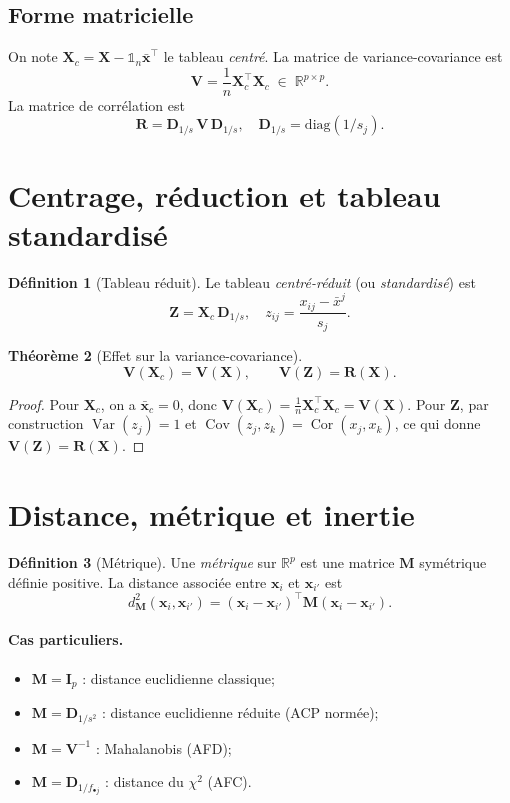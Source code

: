 \documentclass[11pt, a4paper, openany]{book}
\theoremstyle{plain}
\newtheorem{theorem}{Théorème}[chapter]
\theoremstyle{definition}
\newtheorem{definition}[theorem]{Définition}
\theoremstyle{remark}
\newcommand{\R}{\mathbb{R}}
\newcommand{\1}{\mathds{1}}
\DeclareMathOperator{\Var}{Var}
\DeclareMathOperator{\Cov}{Cov}
\DeclareMathOperator{\Cor}{Cor}
\newcommand{\X}{\mathbf{X}}
\newcommand{\V}{\mathbf{V}}
\newcommand{\M}{\mathbf{M}}
\newcommand{\Z}{\mathbf{Z}}
\begin{document}
\subsection{Forme matricielle}
On note $\X_c = \X - \1_n \bar{\mathbf{x}}^\top$ le tableau \textit{centré}. La
matrice de variance-covariance est
\[
\V = \frac{1}{n} \X_c^\top \X_c \;\in\; \R^{p \times p}.
\]
La matrice de corrélation est
\[
\mathbf{R} = \mathbf{D}_{1/s}\, \V\, \mathbf{D}_{1/s}, \quad
\mathbf{D}_{1/s} = \mathrm{diag}(1/s_j).
\]

\section{Centrage, réduction et tableau standardisé}

\begin{definition}[Tableau réduit]
Le tableau \textit{centré-réduit} (ou \textit{standardisé}) est
\[
\Z = \X_c\, \mathbf{D}_{1/s}, \quad z_{ij} = \frac{x_{ij} - \bar{x}^j}{s_j}.
\]
\end{definition}

\begin{theorem}[Effet sur la variance-covariance]
\[
\V(\X_c) = \V(\X), \qquad \V(\Z) = \mathbf{R}(\X).
\]
\end{theorem}

\begin{proof}
Pour $\X_c$, on a $\bar{\mathbf{x}}_c = 0$, donc $\V(\X_c) = \frac{1}{n}\X_c^\top\X_c = \V(\X)$.
Pour $\Z$, par construction $\Var(z_j) = 1$ et $\Cov(z_j, z_k) = \Cor(x_j, x_k)$,
ce qui donne $\V(\Z) = \mathbf{R}(\X)$.
\end{proof}

\section{Distance, métrique et inertie}

\begin{definition}[Métrique]
Une \textit{métrique} sur $\R^p$ est une matrice $\M$ symétrique définie
positive. La distance associée entre $\mathbf{x}_i$ et $\mathbf{x}_{i'}$ est
\[
d_{\M}^2(\mathbf{x}_i, \mathbf{x}_{i'}) = (\mathbf{x}_i - \mathbf{x}_{i'})^\top \M (\mathbf{x}_i - \mathbf{x}_{i'}).
\]
\end{definition}

\paragraph{Cas particuliers.}
\begin{itemize}
  \item $\M = \mathbf{I}_p$ : distance euclidienne classique;
  \item $\M = \mathbf{D}_{1/s^2}$ : distance euclidienne réduite (ACP normée);
  \item $\M = \V^{-1}$ : Mahalanobis (AFD);
  \item $\M = \mathbf{D}_{1/f_{\bullet j}}$ : distance du $\chi^2$ (AFC).
\end{itemize}
\end{document}
